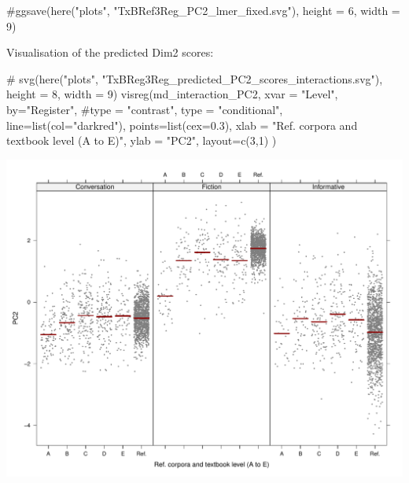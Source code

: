 \documentclass[
  letterpaper,
  DIV=11,
  numbers=noendperiod]{scrreprt}
\newenvironment{Shaded}{\begin{snugshade}}{\end{snugshade}}
\newcommand{\AttributeTok}[1]{\textcolor[rgb]{0.40,0.45,0.13}{#1}}
\newcommand{\CommentTok}[1]{\textcolor[rgb]{0.37,0.37,0.37}{#1}}
\newcommand{\DecValTok}[1]{\textcolor[rgb]{0.68,0.00,0.00}{#1}}
\newcommand{\FloatTok}[1]{\textcolor[rgb]{0.68,0.00,0.00}{#1}}
\newcommand{\FunctionTok}[1]{\textcolor[rgb]{0.28,0.35,0.67}{#1}}
\newcommand{\NormalTok}[1]{\textcolor[rgb]{0.00,0.23,0.31}{#1}}
\newcommand{\StringTok}[1]{\textcolor[rgb]{0.13,0.47,0.30}{#1}}
\begin{document}
\begin{Shaded}
\begin{Highlighting}[]
\CommentTok{\#ggsave(here("plots", "TxBRef3Reg\_PC2\_lmer\_fixed.svg"), height = 6, width = 9)}
\end{Highlighting}
\end{Shaded}

Visualisation of the predicted Dim2 scores:

\begin{Shaded}
\begin{Highlighting}[]
\CommentTok{\# svg(here("plots", "TxBReg3Reg\_predicted\_PC2\_scores\_interactions.svg"), height = 8, width = 9)}
\FunctionTok{visreg}\NormalTok{(md\_interaction\_PC2, }\AttributeTok{xvar =} \StringTok{"Level"}\NormalTok{, }\AttributeTok{by=}\StringTok{"Register"}\NormalTok{, }
       \CommentTok{\#type = "contrast",}
       \AttributeTok{type =} \StringTok{"conditional"}\NormalTok{,}
       \AttributeTok{line=}\FunctionTok{list}\NormalTok{(}\AttributeTok{col=}\StringTok{"darkred"}\NormalTok{), }
       \AttributeTok{points=}\FunctionTok{list}\NormalTok{(}\AttributeTok{cex=}\FloatTok{0.3}\NormalTok{),}
       \AttributeTok{xlab =} \StringTok{"Ref. corpora and textbook level (A to E)"}\NormalTok{, }\AttributeTok{ylab =} \StringTok{"PC2"}\NormalTok{,}
       \AttributeTok{layout=}\FunctionTok{c}\NormalTok{(}\DecValTok{3}\NormalTok{,}\DecValTok{1}\NormalTok{)}
\NormalTok{)}
\end{Highlighting}
\end{Shaded}

\includegraphics{G_Ch7_Analysis_files/figure-pdf/Dim2estimateplots-1.pdf}
\end{document}
